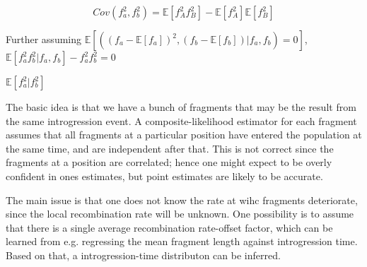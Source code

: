\documentclass[10pt,a4paper]{article}
\newcommand{\BE}[1]{\mathbb{E}\left[#1\right]}
\begin{document}
$$Cov(f_a^2, f_b^2) = \BE{f_{A}^2f_{B}^2} -  \BE{f_A^2}\BE{f_B^2}$$

Further assuming
$\BE{ ( (f_a-\BE{f_a})^2, (f_b-\BE{f_b}) | f_a, f_b) = 0}$,
$\BE{f_a^2f_b^2 | f_a, f_b} - f_a^2f_b^2=0$

$\BE{f_a^2 | f_b^2}$

The basic idea is that we have a bunch of fragments that may be the result from the same introgression event. A composite-likelihood estimator for each fragment assumes that all fragments at a particular position have entered the population at the same time, and are independent after that. This is not correct since the fragments at a position are correlated; hence one might expect to be overly confident in ones estimates, but point estimates are likely to be accurate. 

The main issue is that one does not know the rate at wihc fragments deteriorate, since the local recombination rate will be unknown. One possibility is to assume that there is a single average recombination rate-offset factor, which can be learned from e.g. regressing the mean fragment length against introgression time. Based on that, a introgression-time distributon can be inferred. 
\end{document}
